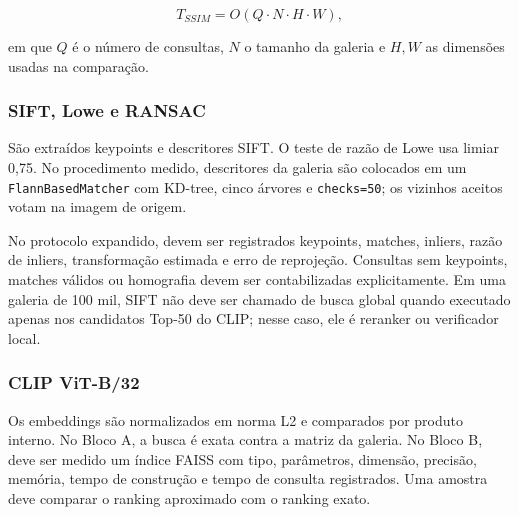 \documentclass[12pt]{article}
\newcommand{\clip}{CLIP}
\newcommand{\sift}{SIFT}
\newcommand{\ssim}{SSIM}
\newcommand{\faiss}{FAISS}
\begin{document}
\begin{equation}
T_{\ssim}=O(Q\cdot N\cdot H\cdot W),
\label{eq:complexidade-ssim}
\end{equation}

em que $Q$ é o número de consultas, $N$ o tamanho da galeria e $H,W$ as
dimensões usadas na comparação.

\subsubsection{SIFT, Lowe e RANSAC}

São extraídos keypoints e descritores SIFT. O teste de razão de Lowe usa
limiar 0,75. No procedimento medido, descritores da galeria são colocados em
um \texttt{FlannBasedMatcher} com KD-tree, cinco árvores e
\texttt{checks=50}; os vizinhos aceitos votam na imagem de origem.

No protocolo expandido, devem ser registrados keypoints, matches, inliers,
razão de inliers, transformação estimada e erro de reprojeção. Consultas sem
keypoints, matches válidos ou homografia devem ser contabilizadas
explicitamente. Em uma galeria de 100 mil, \sift{} não deve ser chamado de
busca global quando executado apenas nos candidatos Top-50 do \clip{}; nesse
caso, ele é reranker ou verificador local.

\subsubsection{CLIP ViT-B/32}

Os embeddings são normalizados em norma L2 e comparados por produto interno.
No Bloco A, a busca é exata contra a matriz da galeria. No Bloco B, deve ser
medido um índice \faiss{} com tipo, parâmetros, dimensão, precisão, memória,
tempo de construção e tempo de consulta registrados. Uma amostra deve
comparar o ranking aproximado com o ranking exato.
\end{document}
